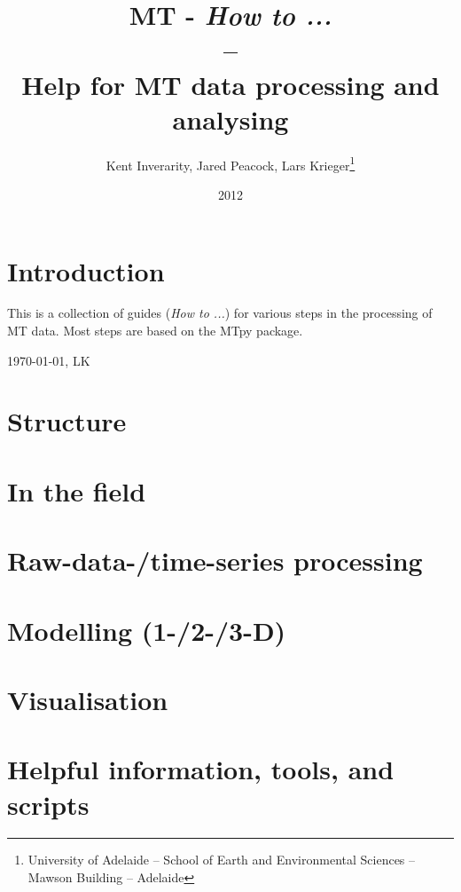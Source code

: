 \documentclass[%
onecolumn,%
11pt,%
DIV12%
]{scrreprt}
\title  {MT - \textit{How to ...}  \\ -- \\Help for MT data processing and analysing }
\author{Kent Inverarity, Jared Peacock, Lars Krieger\thanks{University of Adelaide -- School of Earth and Environmental Sciences -- Mawson Building -- Adelaide}
  }
\date{2012}
\begin{document}
\linenumbers

\maketitle

\chapter*{Introduction}

This is a collection of guides (\textit{How to ...}) for various steps in the processing of MT data. Most steps are based on the MTpy package.

\vspace{4cm}
{\small \today, LK} 

\tableofcontents

\chapter{Structure}
\label{ch:Structure}



\chapter{In the field }
\label{ch:field}


\chapter{Raw-data-/time-series processing }
\label{ch:processing}


\chapter{Modelling (1-/2-/3-D) }
\label{ch:modeling}


\chapter{Visualisation }
\label{ch:visualisation}


\chapter{Helpful information, tools, and scripts}
\label{ch:tools}

\end{document}
